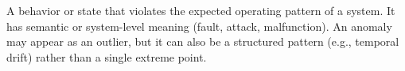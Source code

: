 \documentclass[a4paper]{article}
\title{}
\date{}
\begin{document}
    \maketitle
    
    A behavior or state that violates the expected operating pattern of a system.
    It has semantic or system-level meaning (fault, attack, malfunction).
    An anomaly may appear as an outlier, but it can also be a structured pattern (e.g., temporal drift) rather than a single extreme point.
\end{document}
